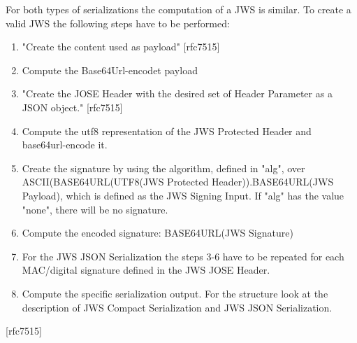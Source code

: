 For both types of serializations the computation of a JWS is similar. To create a valid JWS the following steps have to be performed: 
\begin{enumerate}
\item "Create the content used as payload" [rfc7515]
\item Compute the Base64Url-encodet payload 
\item "Create the JOSE Header with the desired set of Header Parameter as a JSON object." [rfc7515]
\item Compute the utf8 representation of the JWS Protected Header and base64url-encode it.
\item Create the signature by using the algorithm, defined in "alg", over  ASCII(BASE64URL(UTF8(JWS Protected Header)).BASE64URL(JWS Payload), which is defined as the JWS Signing Input. If "alg" has the value "none", there will be no signature.
\item Compute the encoded signature: BASE64URL(JWS Signature)
\item For the JWS JSON Serialization the steps 3-6 have to be repeated for each MAC/digital signature defined in the JWS JOSE Header.
\item Compute the specific serialization output. For the structure look at the description of JWS Compact Serialization and JWS JSON Serialization.
\end{enumerate} [rfc7515]



